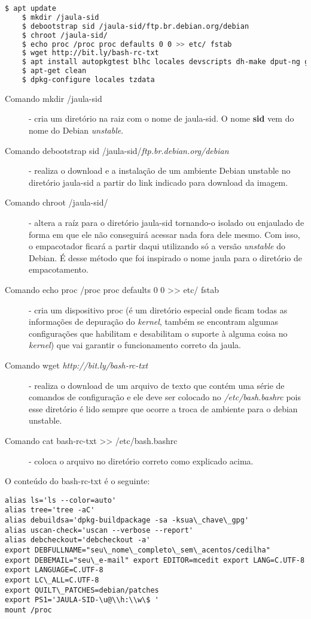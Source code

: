\begin{lstlisting}[language=bash]
	$ apt update
	$ mkdir /jaula-sid
	$ debootstrap sid /jaula-sid/ftp.br.debian.org/debian
	$ chroot /jaula-sid/
	$ echo proc /proc proc defaults 0 0 >> etc/ fstab
	$ wget http://bit.ly/bash-rc-txt
	$ apt install autopkgtest blhc locales devscripts dh-make dput-ng git-buildpackage mc quilt spell tardiff tree lintian
	$ apt-get clean
	$ dpkg-configure locales tzdata
\end{lstlisting}

\begin{description}

	\item[Comando mkdir /jaula-sid] - cria um diretório na raiz com o nome de jaula-sid. O nome \textbf{sid} vem do nome do Debian \textit{unstable}.
	\item[Comando debootstrap sid /jaula-sid/\textit{ftp.br.debian.org/debian}] - realiza o download e a instalação de um ambiente Debian unstable no diretório jaula-sid a partir do link indicado para download da imagem.
	\item[Comando chroot /jaula-sid/] - altera a raíz para o diretório jaula-sid tornando-o isolado ou enjaulado de forma em que ele não conseguirá acessar nada fora dele mesmo. Com isso, o empacotador ficará a partir daqui utilizando só a versão \textit{unstable} do Debian. É desse método que foi inspirado o nome jaula para o diretório de empacotamento.
	\item[Comando echo proc /proc proc defaults 0 0 >> etc/ fstab] - cria um dispositivo proc (é um diretório especial onde ficam todas as informações de depuração do \textit{kernel}, também se encontram algumas configurações que habilitam e desabilitam o suporte à alguma coisa no \textit{kernel}) que vai garantir o funcionamento correto da jaula.
	\item[Comando wget \textit{http://bit.ly/bash-rc-txt}] - realiza o download de um arquivo de texto que contém uma série de comandos de configuração e ele deve ser colocado no \textit{/etc/bash.bashrc} pois esse diretório é lido sempre que ocorre a troca de ambiente para o debian unstable.
	\item[Comando cat bash-rc-txt >> /etc/bash.bashrc] - coloca o arquivo no diretório correto como explicado acima.

\end{description}

O conteúdo do bash-rc-txt é o seguinte:
\begin{verbatim}
alias ls='ls --color=auto' 
alias tree='tree -aC' 
alias debuildsa='dpkg-buildpackage -sa -ksua\_chave\_gpg' 
alias uscan-check='uscan --verbose --report' 
alias debcheckout='debcheckout -a' 
export DEBFULLNAME="seu\_nome\_completo\_sem\_acentos/cedilha" 
export DEBEMAIL="seu\_e-mail" export EDITOR=mcedit export LANG=C.UTF-8 export LANGUAGE=C.UTF-8 
export LC\_ALL=C.UTF-8 
export QUILT\_PATCHES=debian/patches 
export PS1='JAULA-SID-\u@\\h:\\w\$ ' 
mount /proc 
\end{verbatim}


